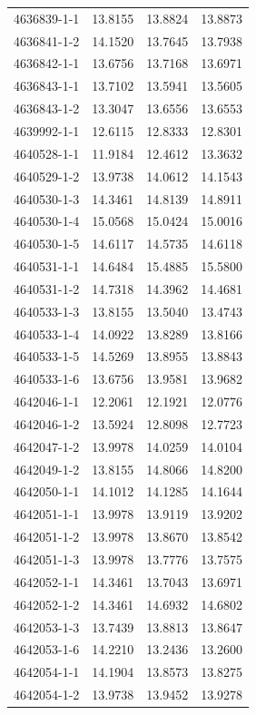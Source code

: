 \begin{longtable}{lrrr}
4636839-1-1 & 13.8155 & 13.8824 & 13.8873 \\
4636841-1-2 & 14.1520 & 13.7645 & 13.7938 \\
4636842-1-1 & 13.6756 & 13.7168 & 13.6971 \\
4636843-1-1 & 13.7102 & 13.5941 & 13.5605 \\
4636843-1-2 & 13.3047 & 13.6556 & 13.6553 \\
4639992-1-1 & 12.6115 & 12.8333 & 12.8301 \\
4640528-1-1 & 11.9184 & 12.4612 & 13.3632 \\
4640529-1-2 & 13.9738 & 14.0612 & 14.1543 \\
4640530-1-3 & 14.3461 & 14.8139 & 14.8911 \\
4640530-1-4 & 15.0568 & 15.0424 & 15.0016 \\
4640530-1-5 & 14.6117 & 14.5735 & 14.6118 \\
4640531-1-1 & 14.6484 & 15.4885 & 15.5800 \\
4640531-1-2 & 14.7318 & 14.3962 & 14.4681 \\
4640533-1-3 & 13.8155 & 13.5040 & 13.4743 \\
4640533-1-4 & 14.0922 & 13.8289 & 13.8166 \\
4640533-1-5 & 14.5269 & 13.8955 & 13.8843 \\
4640533-1-6 & 13.6756 & 13.9581 & 13.9682 \\
4642046-1-1 & 12.2061 & 12.1921 & 12.0776 \\
4642046-1-2 & 13.5924 & 12.8098 & 12.7723 \\
4642047-1-2 & 13.9978 & 14.0259 & 14.0104 \\
4642049-1-2 & 13.8155 & 14.8066 & 14.8200 \\
4642050-1-1 & 14.1012 & 14.1285 & 14.1644 \\
4642051-1-1 & 13.9978 & 13.9119 & 13.9202 \\
4642051-1-2 & 13.9978 & 13.8670 & 13.8542 \\
4642051-1-3 & 13.9978 & 13.7776 & 13.7575 \\
4642052-1-1 & 14.3461 & 13.7043 & 13.6971 \\
4642052-1-2 & 14.3461 & 14.6932 & 14.6802 \\
4642053-1-3 & 13.7439 & 13.8813 & 13.8647 \\
4642053-1-6 & 14.2210 & 13.2436 & 13.2600 \\
4642054-1-1 & 14.1904 & 13.8573 & 13.8275 \\
4642054-1-2 & 13.9738 & 13.9452 & 13.9278 \\

\end{longtable}
